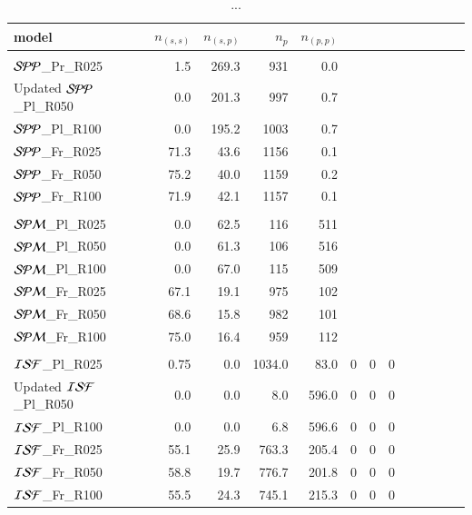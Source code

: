 \documentclass[aa]{lib/aa}
\begin{document}
\begin{table}
 \caption{...}
 \label{Tab:model_PP}
 \centering 
 \begin{tabular}{lrrrrrrrrrrrr}
   \hline\hline
   model & $n_{(s,s)}$ & $n_{(s,p)}$ & $n_{p}$ & $n_{(p,p)}$ \\
        \hline \vspace{-0.75em}\\
${\cal SPP}$\_Pr\_R025 &  1.5 & 269.3 &  931 & 0.0 \\ Updated
${\cal SPP}$\_Pl\_R050 &  0.0 & 201.3 &  997 & 0.7 \\
${\cal SPP}$\_Pl\_R100 &  0.0 & 195.2 & 1003 & 0.7 \\
${\cal SPP}$\_Fr\_R025 & 71.3 &  43.6 & 1156 & 0.1 \\
${\cal SPP}$\_Fr\_R050 & 75.2 &  40.0 & 1159 & 0.2 \\
${\cal SPP}$\_Fr\_R100 & 71.9 &  42.1 & 1157 & 0.1 \\
 \hline
  \hline \vspace{-0.75em}\\
${\cal SPM}$\_Pl\_R025 & 0.0  & 62.5 & 116 & 511 \\
${\cal SPM}$\_Pl\_R050 & 0.0  & 61.3 & 106 & 516 \\
${\cal SPM}$\_Pl\_R100 & 0.0  & 67.0 & 115 & 509 \\
${\cal SPM}$\_Fr\_R025 & 67.1 & 19.1 & 975 & 102 \\
${\cal SPM}$\_Fr\_R050 & 68.6 & 15.8 & 982 & 101 \\
${\cal SPM}$\_Fr\_R100 & 75.0 & 16.4 & 959 & 112 \\
  \hline
  \hline \vspace{-0.75em}\\
${\cal ISF}$\_Pl\_R025 & 0.75 & 0.0 & 1034.0 & 83.0 & 0 & 0 & 0 \\ Updated
${\cal ISF}$\_Pl\_R050 & 0.0 & 0.0 & 8.0 & 596.0 & 0 & 0 & 0 \\
${\cal ISF}$\_Pl\_R100 & 0.0 & 0.0 & 6.8 & 596.6 & 0 & 0 & 0 \\
${\cal ISF}$\_Fr\_R025 & 55.1 & 25.9 & 763.3 & 205.4 & 0 & 0 & 0 \\
${\cal ISF}$\_Fr\_R050 & 58.8 & 19.7 & 776.7 & 201.8 & 0 & 0 & 0 \\
${\cal ISF}$\_Fr\_R100 & 55.5 & 24.3 & 745.1 & 215.3 & 0 & 0 & 0 \\
  \hline
 \end{tabular}
\end{table}
\end{document}
